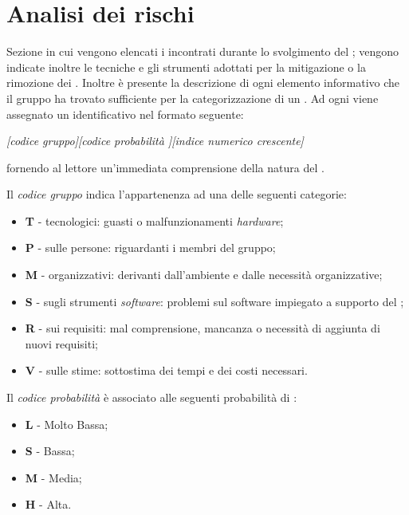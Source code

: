 \section{Analisi dei rischi} 
Sezione in cui vengono elencati i  incontrati durante lo svolgimento del ; vengono indicate inoltre le tecniche e gli strumenti adottati per la mitigazione o la rimozione dei . Inoltre \`e presente la descrizione di ogni elemento informativo che il gruppo ha trovato sufficiente per la categorizzazione di un .
Ad ogni  viene assegnato un identificativo nel formato seguente: 

\begin{center}
\textit{[codice gruppo][codice probabilit\`a ][indice numerico crescente]}  
\end{center}

fornendo al lettore un'immediata comprensione della natura del .

Il \textit{codice gruppo} indica l'appartenenza ad una delle seguenti categorie:
\begin{itemize}
\item \textbf{T} -  tecnologici: guasti o malfunzionamenti \textit{hardware};
\item \textbf{P} -  sulle persone: riguardanti i membri del gruppo;
\item \textbf{M} -  organizzativi: derivanti dall'ambiente e dalle necessit\`a organizzative;
\item \textbf{S} -  sugli strumenti \textit{software}: problemi sul software impiegato a supporto del ;
\item \textbf{R} -  sui requisiti: mal comprensione, mancanza o necessit\`a di aggiunta di nuovi requisiti;
\item \textbf{V} -  sulle stime: sottostima dei tempi e dei costi necessari.
\end{itemize}

Il \textit{codice probabilit\`a } \`e associato alle seguenti probabilit\`a di : 
\begin{itemize}
\item \textbf{L} - Molto Bassa;
\item \textbf{S} - Bassa;
\item \textbf{M} - Media;
\item \textbf{H} - Alta.
\end{itemize}

